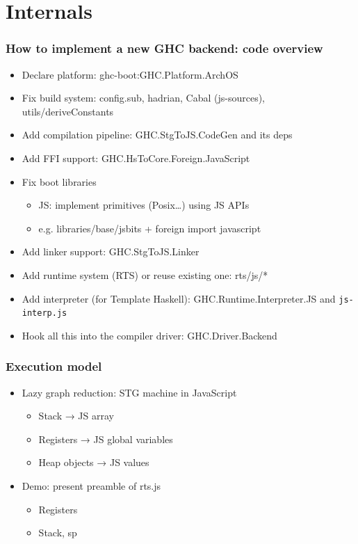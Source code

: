 \documentclass{beamer}
\begin{document}
\section{Internals}


\begin{frame}
  \frametitle{How to implement a new GHC backend: code overview}
  \begin{itemize}
\item Declare platform: ghc-boot:GHC.Platform.ArchOS
\item Fix build system: config.sub, hadrian, Cabal (js-sources),
  utils/deriveConstants
\item Add compilation pipeline: GHC.StgToJS.CodeGen and its deps
\item Add FFI support: GHC.HsToCore.Foreign.JavaScript
\item Fix boot libraries
  \begin{itemize}
\item JS: implement primitives (Posix…) using JS APIs
\item e.g. libraries/base/jsbits + foreign import javascript
  \end{itemize}
\item Add linker support: GHC.StgToJS.Linker
\item Add runtime system (RTS) or reuse existing one: rts/js/*
\item Add interpreter (for Template Haskell): GHC.Runtime.Interpreter.JS and
  \texttt{js-interp.js}
\item Hook all this into the compiler driver: GHC.Driver.Backend
\end{itemize}
\end{frame}


\begin{frame}
\frametitle{Execution model}
  \begin{itemize}
    \item Lazy graph reduction: STG machine in JavaScript
      \begin{itemize}
    \item Stack → JS array
    \item Registers → JS global variables
    \item Heap objects  → JS values
      \end{itemize}
    \item Demo: present preamble of rts.js
      \begin{itemize}
        \item Registers
        \item Stack, sp
      \end{itemize}
    \end{itemize}
\end{frame}
\end{document}
